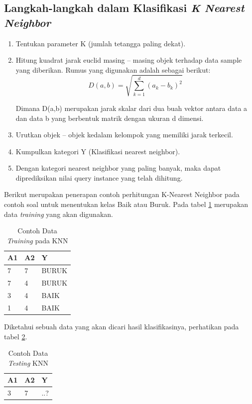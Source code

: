\subsection{Langkah-langkah dalam Klasifikasi \textit{K Nearest Neighbor}}
\begin{enumerate}
    \item Tentukan parameter K (jumlah tetangga paling dekat).
    \item Hitung kuadrat jarak euclid masing – masing objek terhadap data sample yang
diberikan. Rumus yang digunakan adalah sebagai berikut:
    \begin{equation}
        D(a,b)= \sqrt{\sum_{k=1}^{d}(a_{k}-b_{k})^{2}}
        \label{rumusknn1}
    \end{equation}
    \par Dimana D(a,b) merupakan jarak skalar dari dua buah vektor antara data a dan data b yang berbentuk matrik dengan ukuran d dimensi.
    \item Urutkan objek – objek kedalam kelompok yang memiliki jarak terkecil.
    \item Kumpulkan kategori Y (Klasifikasi nearest neighbor).
    \item Dengan kategori nearest neighbor yang paling banyak, maka dapat diprediksikan
nilai query instance yang telah dihitung\cite{zainuddin2019implementasi}.
\end{enumerate}
Berikut merupakan penerapan contoh perhitungan K-Nearest Neighbor pada contoh soal untuk menentukan kelas Baik atau Buruk. Pada tabel \ref{knn1} merupakan data \textit{training} yang akan digunakan.
\begin{table}[!ht]
\centering
\caption{Contoh Data \textit{Training} pada KNN}
\label{knn1}
\begin{tabular}{|l|l|l|}
\hline
A1 & A2 & Y     \\ \hline
7  & 7  & BURUK \\ \hline
7  & 4  & BURUK \\ \hline
3  & 4  & BAIK  \\ \hline
1  & 4  & BAIK  \\ \hline
\end{tabular}
\end{table}
Diketahui sebuah data yang akan dicari hasil klasifikasinya, perhatikan pada tabel \ref{knn2}.
\begin{table}[!ht]
\centering
\caption{Contoh Data \textit{Testing} KNN}
\label{knn2}
\begin{tabular}{|l|l|l|}
\hline
A1 & A2 & Y   \\ \hline
3  & 7  & ..? \\ \hline
\end{tabular}
\end{table}
